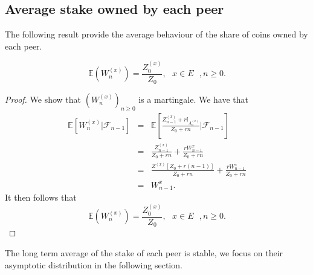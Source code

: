 \subsection{Average stake owned by each peer}
The following result provide the average behaviour of the share of coins owned by each peer.
\begin{prop}\label{prop:average_stakes}
$$
\mathbb{E}(W_n^{(x)}) = \frac{Z_0^{(x)}}{Z_0},\text{ }x\in E\text{ }, n\geq0.
$$
\end{prop}
\begin{proof}
We show that $(W_n^{(x)})_{n\geq0}$ is a martingale. We have that 
\begin{eqnarray*}
\mathbb{E}\left[W_n^{(x)}|\mathcal{F}_{n-1}\right]&=& \mathbb{E}\left[\frac{Z^{(x)}_{n-1} + r\mathbb{I}_{A_n^{(x)}}}{Z_0 + rn}\Big \rvert\mathcal{F}_{n-1}\right]\\
&=& \frac{Z^{(x)}_{n-1} }{Z_0 + rn}+\frac{rW_{n-1}^{x}}{Z_0 + rn}\\\
&=& \frac{Z^{(x)}[Z_0 + r(n-1)]}{Z_0 + rn}+\frac{rW_{n-1}^{x}}{Z_0 + rn}\\
&=&W_{n-1}^{x}.
\end{eqnarray*}
It then follows that 
$$
\mathbb{E}(W_n^{(x)}) = \frac{Z_0^{(x)}}{Z_0},\text{ }x\in E\text{ }, n\geq0.
$$
\end{proof}
The long term average of the stake of each peer is stable, we focus on their asymptotic distribution in the following section.
